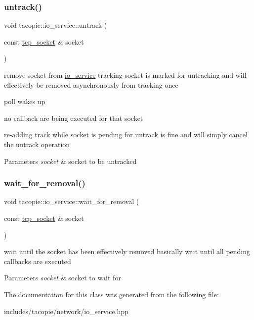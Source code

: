\subsubsection{\texorpdfstring{untrack()}{untrack()}}
{\footnotesize\ttfamily void tacopie\+::io\+\_\+service\+::untrack (\begin{DoxyParamCaption}\item[{const \hyperlink{classtacopie_1_1tcp__socket}{tcp\+\_\+socket} \&}]{socket }\end{DoxyParamCaption})}

remove socket from \hyperlink{classtacopie_1_1io__service}{io\+\_\+service} tracking socket is marked for untracking and will effectively be removed asynchronously from tracking once
\begin{DoxyItemize}
\item poll wakes up
\item no callback are being executed for that socket
\end{DoxyItemize}

re-\/adding track while socket is pending for untrack is fine and will simply cancel the untrack operation


\begin{DoxyParams}{Parameters}
{\em socket} & socket to be untracked \\
\hline
\end{DoxyParams}
\mbox{\label{classtacopie_1_1io__service_aa57db619baeaa6db0aeb22e67b895cd7}} 
\subsubsection{\texorpdfstring{wait\+\_\+for\+\_\+removal()}{wait\_for\_removal()}}
{\footnotesize\ttfamily void tacopie\+::io\+\_\+service\+::wait\+\_\+for\+\_\+removal (\begin{DoxyParamCaption}\item[{const \hyperlink{classtacopie_1_1tcp__socket}{tcp\+\_\+socket} \&}]{socket }\end{DoxyParamCaption})}

wait until the socket has been effectively removed basically wait until all pending callbacks are executed


\begin{DoxyParams}{Parameters}
{\em socket} & socket to wait for \\
\hline
\end{DoxyParams}


The documentation for this class was generated from the following file\+:\begin{DoxyCompactItemize}
\item 
includes/tacopie/network/io\+\_\+service.\+hpp\end{DoxyCompactItemize}
